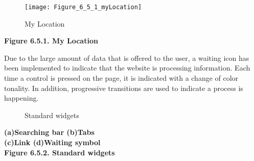 

\begin{figure}[ht]
    \centering
    \texttt{[image: Figure\_6\_5\_1\_myLocation]}
    \caption{My Location}
\end{figure}
\begin{center}
    \bf{ 
    Figure 6.5.1. My Location}
  \end{center} 



Due to the large amount of data that is offered to the user, a waiting icon has been implemented to indicate that the website is processing information.
Each time a control is pressed on the page, it is indicated with a change of color tonality.
In addition, progressive transitions are used to indicate a process is happening.\\

\begin{figure}[ht]
    \centering
    \hfill
    \vfill
    \hfill
    \caption{Standard widgets}
\end{figure}

\begin{center}
    \bf{ (a)Searching bar (b)Tabs\\
    (c)Link (d)Waiting symbol\\
    
    Figure 6.5.2. Standard widgets}
  \end{center} 